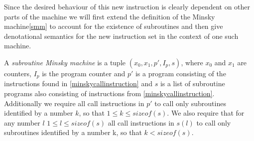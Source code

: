 Since the desired behaviour of this new instruction is clearly dependent on other parts of the machine we will first extend the definition of the Minsky machine\ref{smm} to account for the existence of subroutines and then give denotational semantics for the new instruction set in the context of one such machine.
\begin{definition}
\label{smm}
A \emph{subroutine Minsky machine} is a tuple $(x_0, x_1, p', I_p, s)$, where $x_0$ and $x_1$ are counters, $I_p$ is the program counter and $p'$ is a program consisting of the instructions found in \autoref{minskycallinstruction} and $s$ is a list of subroutine programs also consisting of instructions from \autoref{minskycallinstruction}.\\
Additionally we require all call instructions in $p'$ to call only subroutines identified by a number $k$, so that $1 \leq k \leq sizeof(s)$.
We also require that for any number $l$ $1 \leq l \leq sizeof(s)$ all call instructions in $s(l)$ to call only subroutines identified by a number k, so that $k < sizeof(s)$.
\end{definition}

